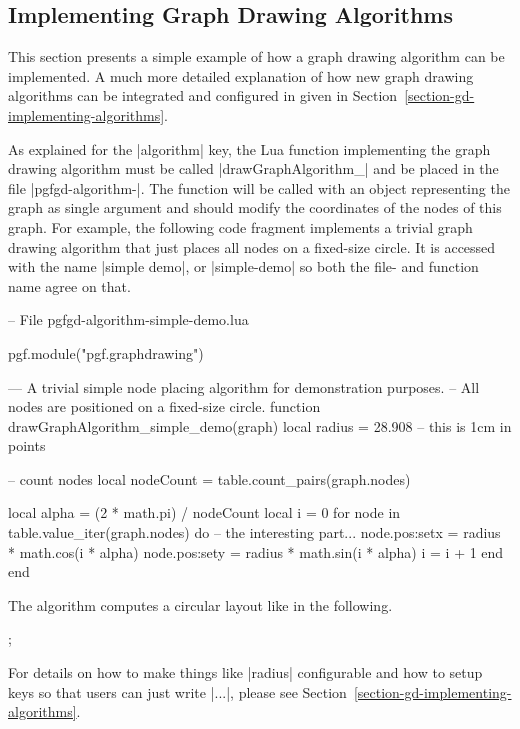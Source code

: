 \subsection{Implementing Graph Drawing Algorithms}

\label{section-gd-own-algorithm}
\label{section-library-graphdrawing-ownAlgorithm}

This section presents a simple example of how a graph drawing
algorithm can be implemented. A much more detailed explanation of how
new graph drawing algorithms can be integrated and configured in given
in Section~\ref{section-gd-implementing-algorithms}.

As explained for the |algorithm| key, the Lua function implementing
the graph drawing algorithm must be called
|drawGraphAlgorithm_| and be placed in the file
|pgfgd-algorithm-|. The function
will be called with an object representing the graph as single
argument and should modify the coordinates of the nodes of this 
graph. For example, the following code fragment implements a trivial
graph drawing algorithm that just places all nodes on a fixed-size
circle.  It is accessed with the name 
|simple demo|, or |simple-demo| so both the file- and function name 
agree on that.


\begin{codeexample}
-- File pgfgd-algorithm-simple-demo.lua
  
pgf.module("pgf.graphdrawing")

--- A trivial simple node placing algorithm for demonstration purposes.
-- All nodes are positioned on a fixed-size circle.
function drawGraphAlgorithm_simple_demo(graph)
   local radius = 28.908  -- this is 1cm in points

   -- count nodes
   local nodeCount = table.count_pairs(graph.nodes)

   local alpha = (2 * math.pi) / nodeCount
   local i = 0
   for node in table.value_iter(graph.nodes) do
      -- the interesting part...
      node.pos:set{x = radius * math.cos(i * alpha)}
      node.pos:set{y = radius * math.sin(i * alpha)}
      i = i + 1
   end
end
\end{codeexample}

The algorithm computes a circular layout like in the following.

\begin{codeexample}[]
\tikz [graph drawing scope, /graph drawing/algorithm=simple demo]
  ;
\end{codeexample}

For details on how to make things like |radius| configurable and how
to setup keys so that users can just write
| ...|, please see Section~\ref{section-gd-implementing-algorithms}.


\endinput


